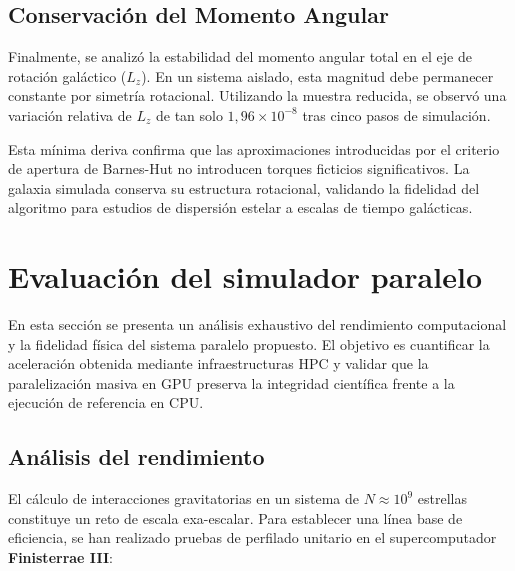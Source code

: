 \subsection{Conservación del Momento Angular}

Finalmente, se analizó la estabilidad del momento angular total en el eje de rotación galáctico ($L_z$). En un sistema aislado, esta magnitud debe permanecer constante por simetría rotacional.
Utilizando la muestra reducida, se observó una variación relativa de $L_z$ de tan solo \textbf{$1,96 \times 10^{-8}$} tras cinco pasos de simulación.

Esta mínima deriva confirma que las aproximaciones introducidas por el criterio de apertura de Barnes-Hut no introducen torques ficticios significativos.
La galaxia simulada conserva su estructura rotacional, validando la fidelidad del algoritmo para estudios de dispersión estelar a escalas de tiempo galácticas.

\section{Evaluación del simulador paralelo}\label{sec:evaluacion-de-rendimiento-y-precision-cpu-vs-gpu}

En esta sección se presenta un análisis exhaustivo del rendimiento computacional y la fidelidad física del sistema paralelo propuesto.
El objetivo es cuantificar la aceleración obtenida mediante infraestructuras HPC y validar que la paralelización masiva en GPU preserva la integridad científica frente a la ejecución de referencia en CPU.

\subsection{Análisis del rendimiento}\label{subsec:analisis-de-escalabilidad-y-computo-multi-gpu}

El cálculo de interacciones gravitatorias en un sistema de $N \approx 10^9$ estrellas constituye un reto de escala exa-escalar.
Para establecer una línea base de eficiencia, se han realizado pruebas de perfilado unitario en el supercomputador \textbf{Finisterrae III}:

